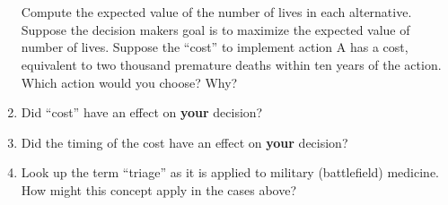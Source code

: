 \documentclass[12pt]{article}
\begin{document}
\begin{enumerate}
\begin{tabular}{cll}
\end{tabular}\\~\\
Compute the expected value of the number of lives in each alternative.
Suppose the decision makers goal is to maximize the expected value of number of lives.
Suppose the ``cost'' to implement action A has a cost, equivalent to two thousand premature deaths within ten years of the action.
Which action would you choose? Why?
\item Did ``cost'' have an effect on \textbf{your} decision?   
\item Did the timing of the cost have an effect on \textbf{your} decision?   
\item Look up the term ``triage'' as it is applied to military (battlefield) medicine.  How might this concept apply in the cases above? 
\end{enumerate}
\end{document}
